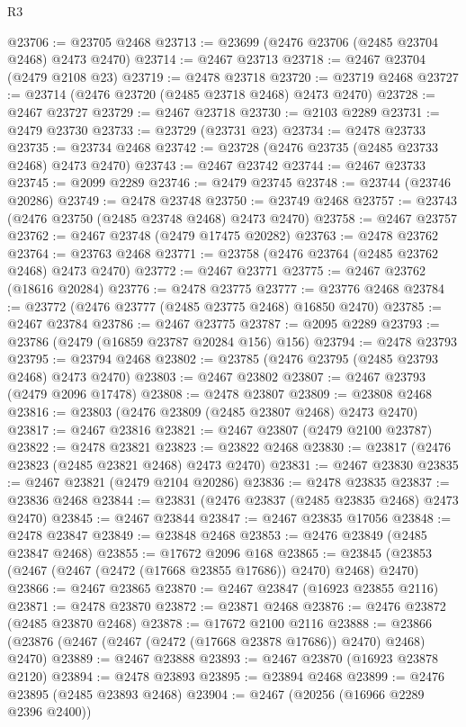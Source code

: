 \begin{lexlean}{R3}
\begin{coremodule}
@23706 := @23705 @2468
@23713 := @23699 (@2476 @23706 (@2485 @23704 @2468) @2473 @2470)
@23714 := @2467 @23713
@23718 := @2467 @23704 (@2479 @2108 @23)
@23719 := @2478 @23718
@23720 := @23719 @2468
@23727 := @23714 (@2476 @23720 (@2485 @23718 @2468) @2473 @2470)
@23728 := @2467 @23727
@23729 := @2467 @23718
@23730 := @2103 @2289
@23731 := @2479 @23730
@23733 := @23729 (@23731 @23)
@23734 := @2478 @23733
@23735 := @23734 @2468
@23742 := @23728 (@2476 @23735 (@2485 @23733 @2468) @2473 @2470)
@23743 := @2467 @23742
@23744 := @2467 @23733
@23745 := @2099 @2289
@23746 := @2479 @23745
@23748 := @23744 (@23746 @20286)
@23749 := @2478 @23748
@23750 := @23749 @2468
@23757 := @23743 (@2476 @23750 (@2485 @23748 @2468) @2473 @2470)
@23758 := @2467 @23757
@23762 := @2467 @23748 (@2479 @17475 @20282)
@23763 := @2478 @23762
@23764 := @23763 @2468
@23771 := @23758 (@2476 @23764 (@2485 @23762 @2468) @2473 @2470)
@23772 := @2467 @23771
@23775 := @2467 @23762 (@18616 @20284)
@23776 := @2478 @23775
@23777 := @23776 @2468
@23784 := @23772 (@2476 @23777 (@2485 @23775 @2468) @16850 @2470)
@23785 := @2467 @23784
@23786 := @2467 @23775
@23787 := @2095 @2289
@23793 := @23786 (@2479 (@16859 @23787 @20284 @156) @156)
@23794 := @2478 @23793
@23795 := @23794 @2468
@23802 := @23785 (@2476 @23795 (@2485 @23793 @2468) @2473 @2470)
@23803 := @2467 @23802
@23807 := @2467 @23793 (@2479 @2096 @17478)
@23808 := @2478 @23807
@23809 := @23808 @2468
@23816 := @23803 (@2476 @23809 (@2485 @23807 @2468) @2473 @2470)
@23817 := @2467 @23816
@23821 := @2467 @23807 (@2479 @2100 @23787)
@23822 := @2478 @23821
@23823 := @23822 @2468
@23830 := @23817 (@2476 @23823 (@2485 @23821 @2468) @2473 @2470)
@23831 := @2467 @23830
@23835 := @2467 @23821 (@2479 @2104 @20286)
@23836 := @2478 @23835
@23837 := @23836 @2468
@23844 := @23831 (@2476 @23837 (@2485 @23835 @2468) @2473 @2470)
@23845 := @2467 @23844
@23847 := @2467 @23835 @17056
@23848 := @2478 @23847
@23849 := @23848 @2468
@23853 := @2476 @23849 (@2485 @23847 @2468)
@23855 := @17672 @2096 @168
@23865 := @23845 (@23853 (@2467 (@2467 (@2472 (@17668 @23855 @17686)) @2470) @2468) @2470)
@23866 := @2467 @23865
@23870 := @2467 @23847 (@16923 @23855 @2116)
@23871 := @2478 @23870
@23872 := @23871 @2468
@23876 := @2476 @23872 (@2485 @23870 @2468)
@23878 := @17672 @2100 @2116
@23888 := @23866 (@23876 (@2467 (@2467 (@2472 (@17668 @23878 @17686)) @2470) @2468) @2470)
@23889 := @2467 @23888
@23893 := @2467 @23870 (@16923 @23878 @2120)
@23894 := @2478 @23893
@23895 := @23894 @2468
@23899 := @2476 @23895 (@2485 @23893 @2468)
@23904 := @2467 (@20256 (@16966 @2289 @2396 @2400))

\end{coremodule}
\end{lexlean}
